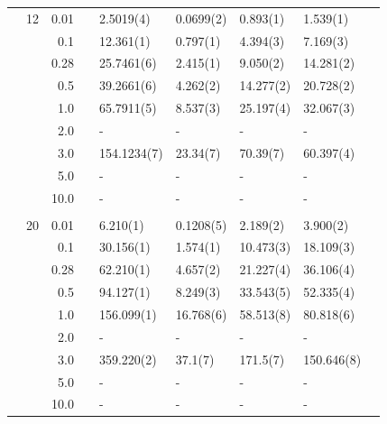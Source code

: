 \begin{table}
\begin{tabularx}{\textwidth}{R{1cm}rrcR{2.3cm}R{2.3cm}R{2.3cm}R{2.3cm}R{1cm}}
		&12 & 0.01 && 2.5019(4) & 0.0699(2) & 0.893(1) & 1.539(1) \\
		&& 0.1 && 12.361(1) & 0.797(1) & 4.394(3) & 7.169(3) \\
		&& 0.28 && 25.7461(6) & 2.415(1) & 9.050(2) & 14.281(2) \\
		&& 0.5 && 39.2661(6) & 4.262(2) & 14.277(2) & 20.728(2) \\
		&& 1.0 && 65.7911(5) & 8.537(3) & 25.197(4) & 32.067(3) \\
		&& 2.0 && - & - & - & -\\
		&& 3.0 && 154.1234(7) & 23.34(7) & 70.39(7) & 60.397(4) \\ 
		&& 5.0 && - & - & - & -\\
		&& 10.0 && - & - & - & -\\
		\hdashline \\
		
		&20 & 0.01 && 6.210(1) & 0.1208(5) & 2.189(2) & 3.900(2) \\
		&& 0.1 && 30.156(1) & 1.574(1) & 10.473(3) & 18.109(3) \\
		&& 0.28 && 62.210(1) & 4.657(2) & 21.227(4) & 36.106(4) \\
		&& 0.5 && 94.127(1) & 8.249(3) & 33.543(5) & 52.335(4) \\
		&& 1.0 && 156.099(1) & 16.768(6) & 58.513(8) & 80.818(6) \\
		&& 2.0 && - & - & - & -\\
		&& 3.0 && 359.220(2) & 37.1(7) & 171.5(7) & 150.646(8) \\ 
		&& 5.0 && - & - & - & -\\
		&& 10.0 && - & - & - & -\\
		\hline \hline
	\end{tabularx}
\end{table} 

\newpage
